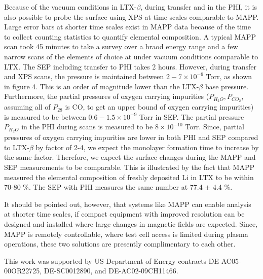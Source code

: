 \documentclass[aip,rsi,amsmath,amssymb,reprint]{revtex4-1}
\begin{document}
Because of the vacuum conditions in LTX-$\beta$, during transfer and in the PHI, it is also possible to probe the surface using XPS at time scales comparable to MAPP. Large error bars at shorter time scales exist in MAPP data because of the time to collect counting statistics to quantify elemental composition. A typical MAPP scan took 45 minutes to take a survey over a braod energy range and a few narrow scans of the elements of choice at under vacuum conditions comparable to LTX. The SEP including transfer to PHI takes 2 hours. However, during transfer and XPS scans, the pressure is maintained between $2-7 \times 10^{-9}$ Torr, as shown in figure 4. This is an order of magnitude lower than the LTX-$\beta$ base pressure. Furthermore, the partial pressures of oxygen carrying impurities ($P_{H_2O},P_{CO_2}$, assuming all of $P_{28}$ is CO, to get an upper bound of oxygen carrying impurities) is measured to be between $0.6-1.5 \times 10^{-9}$ Torr in SEP. The partial pressure $P_{H_2O}$ in the PHI during scans is measured to be $8 \times 10^{-10}$ Torr. Since, partial pressures of oxygen carrying impurities are lower in both PHI and SEP compared to LTX-$\beta$ by factor of 2-4, we expect the monolayer formation time to increase by the same factor. Therefore, we expect the surface changes during the MAPP and SEP measurements to be comparable. This is illustrated by the fact that MAPP measured the elemental composition of freshly deposited Li in LTX to be within 70-80 \%. The SEP with PHI measures the same number at 77.4 $\pm$ 4.4 \%.  

It should be pointed out, however, that systems like MAPP can enable analysis at shorter time scales, if compact equipment with improved resolution can be designed and installed where large changes in magnetic fields are expected. Since, MAPP is remotely controllable, where test cell access is limited during plasma operations, these two solutions are presently complimentary to each other.

\begin{acknowledgments}
This work was supported by US Department of Energy contracts DE-AC05-00OR22725, DE-SC0012890, and DE-AC02-09CH11466.

\end{acknowledgments}


\end{document}
